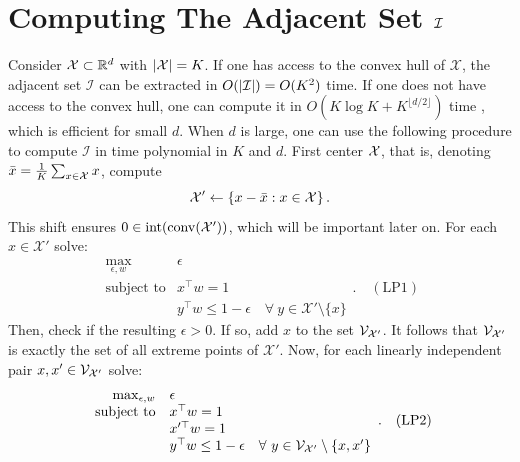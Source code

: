 \section{Computing The Adjacent Set $\mathcal{I}$}\label{appendixadjacent}

Consider $\mathcal{X} \subset \mathbb{R}^d$ with $|\mathcal{X}| = K$. If one has access to the convex hull of $\mathcal{X}$, the adjacent set $\mathcal{I}$ can be extracted in $O(|\mathcal{I}|) =O(K^2)$ time. If one does not have access to the convex hull, one can compute it in $O\left(K \log K +K^{\lfloor d/2 \rfloor}\right)$ time \citep{10.1007/BF02573985}, which is efficient for small $d$. When $d$ is large, one can use the following procedure to compute $\mathcal{I}$ in time polynomial in $K$ and $d$. First center $\mathcal{X}$, that is, denoting $\bar{x} = \frac{1}{K}\sum_{x \in \mathcal{X}} x$, compute \begin{equation}
    \mathcal{X}' \gets \left\{x - \bar{x}:x \in \mathcal{X}\right\}.
\end{equation}
This shift ensures $0 \in \mathrm{int}(\operatorname*{conv}(\mathcal{X}'))$, which will be important later on. For each $x \in \mathcal{X}'$ solve:
$$\begin{array}{rl}
        \max_{\epsilon,w} & \epsilon \\
        \text{subject to} & x^\top w = 1\\
        & y^\top w\leq  1 - \epsilon\quad\forall~ y \in \mathcal{X}' \setminus \{x\}
    \end{array}.\quad (\text{LP}1)$$
Then, check if the resulting $\epsilon > 0$. If so, add $x$ to the set $\mathcal{V}_{\mathcal{X}'}$. It follows that $\mathcal{V}_{\mathcal{X}'}$ is exactly the set of all extreme points of $\mathcal{X}'$. Now, for each linearly independent pair $x,x' \in \mathcal{V}_{\mathcal{X}'}$ solve:
$$\begin{array}{rl}
        \max_{\epsilon,w} & \epsilon \\
        \text{subject to} & x^\top w = 1\\
        & x'^\top w = 1\\
        & y^\top w\leq  1 - \epsilon\quad\forall~ y \in \mathcal{V}_{\mathcal{X}'} \setminus \{x,x'\}
    \end{array}. \quad (\text{LP}2)$$
